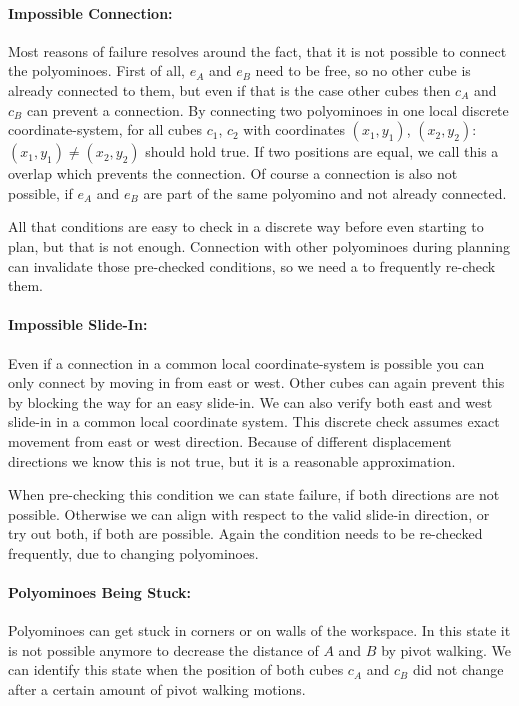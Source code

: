 \paragraph{Impossible Connection:}

Most reasons of failure resolves around the fact, that it is not possible to connect the polyominoes.
First of all, $e_A$ and $e_B$ need to be free, so no other cube is already connected to them, but even if that is the case other cubes then $c_A$ and $c_B$ can prevent a connection.
By connecting two polyominoes in one local discrete coordinate-system, for all cubes $c_1$, $c_2$ with coordinates $(x_1, y_1)$, $(x_2, y_2)$: $(x_1, y_1) \neq (x_2, y_2)$ should hold true.
If two positions are equal, we call this a overlap which prevents the connection.
Of course a connection is also not possible, if $e_A$ and $e_B$ are part of the same polyomino and not already connected.

All that conditions are easy to check in a discrete way before even starting to plan, but that is not enough.
Connection with other polyominoes during planning can invalidate those pre-checked conditions, so we need a to frequently re-check them.

\paragraph{Impossible Slide-In:}

Even if a connection in a common local coordinate-system is possible you can only connect by moving in from east or west.
Other cubes can again prevent this by blocking the way for an easy slide-in.
We can also verify both east and west slide-in in a common local coordinate system.
This discrete check assumes exact movement from east or west direction.
Because of different displacement directions we know this is not true, but it is a reasonable approximation.

When pre-checking this condition we can state failure, if both directions are not possible.
Otherwise we can align with respect to the valid slide-in direction, or try out both, if both are possible.
Again the condition needs to be re-checked frequently, due to changing polyominoes.

\paragraph{Polyominoes Being Stuck:}

Polyominoes can get stuck in corners or on walls of the workspace.
In this state it is not possible anymore to decrease the distance of $A$ and $B$ by pivot walking.
We can identify this state when the position of both cubes $c_A$ and $c_B$ did not change after a certain amount of pivot walking motions.

